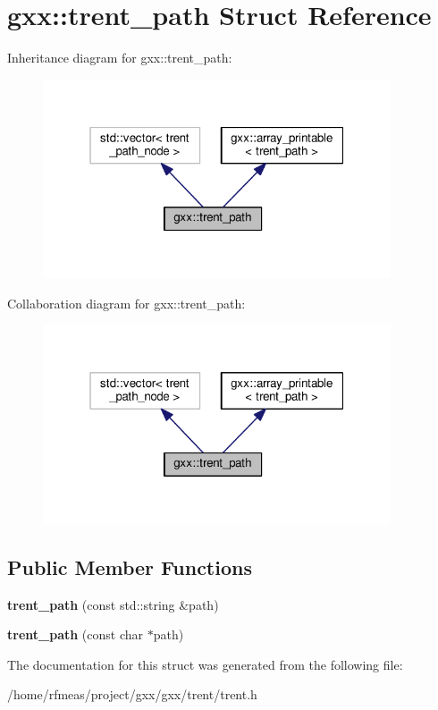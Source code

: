 \hypertarget{structgxx_1_1trent__path}{}\section{gxx\+:\+:trent\+\_\+path Struct Reference}
\label{structgxx_1_1trent__path}


Inheritance diagram for gxx\+:\+:trent\+\_\+path\+:
\nopagebreak
\begin{figure}[H]
\begin{center}
\leavevmode
\includegraphics[width=292pt]{structgxx_1_1trent__path__inherit__graph}
\end{center}
\end{figure}


Collaboration diagram for gxx\+:\+:trent\+\_\+path\+:
\nopagebreak
\begin{figure}[H]
\begin{center}
\leavevmode
\includegraphics[width=292pt]{structgxx_1_1trent__path__coll__graph}
\end{center}
\end{figure}
\subsection*{Public Member Functions}
\begin{DoxyCompactItemize}
\item 
{\bfseries trent\+\_\+path} (const std\+::string \&path)\hypertarget{structgxx_1_1trent__path_a9588bdc54d56b3c5b96a43af16f724fa}{}\label{structgxx_1_1trent__path_a9588bdc54d56b3c5b96a43af16f724fa}

\item 
{\bfseries trent\+\_\+path} (const char $\ast$path)\hypertarget{structgxx_1_1trent__path_a2116856641019d321a8f0527ca8b5919}{}\label{structgxx_1_1trent__path_a2116856641019d321a8f0527ca8b5919}

\end{DoxyCompactItemize}


The documentation for this struct was generated from the following file\+:\begin{DoxyCompactItemize}
\item 
/home/rfmeas/project/gxx/gxx/trent/trent.\+h\end{DoxyCompactItemize}
